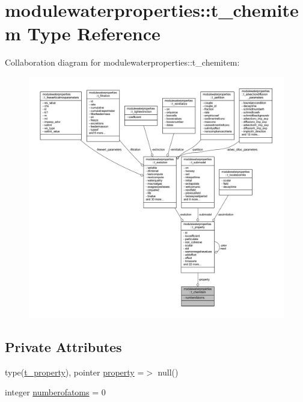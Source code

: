 \hypertarget{structmodulewaterproperties_1_1t__chemitem}{}\section{modulewaterproperties\+:\+:t\+\_\+chemitem Type Reference}
\label{structmodulewaterproperties_1_1t__chemitem}


Collaboration diagram for modulewaterproperties\+:\+:t\+\_\+chemitem\+:\nopagebreak
\begin{figure}[H]
\begin{center}
\leavevmode
\includegraphics[width=350pt]{structmodulewaterproperties_1_1t__chemitem__coll__graph}
\end{center}
\end{figure}
\subsection*{Private Attributes}
\begin{DoxyCompactItemize}
\item 
type(\mbox{\hyperlink{structmodulewaterproperties_1_1t__property}{t\+\_\+property}}), pointer \mbox{\hyperlink{structmodulewaterproperties_1_1t__chemitem_a51e6107fc3fe61150c42181dbc0014b0}{property}} =$>$ null()
\item 
integer \mbox{\hyperlink{structmodulewaterproperties_1_1t__chemitem_a3a06bd917d542c6d93f50a4b72485b54}{numberofatoms}} = 0
\end{DoxyCompactItemize}


